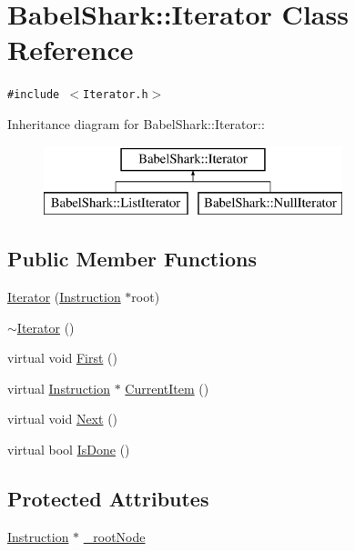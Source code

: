 \hypertarget{class_babel_shark_1_1_iterator}{
\section{BabelShark::Iterator Class Reference}
\label{class_babel_shark_1_1_iterator}
}
{\tt \#include $<$Iterator.h$>$}

Inheritance diagram for BabelShark::Iterator::\begin{figure}[H]
\begin{center}
\leavevmode
\includegraphics[height=2cm]{class_babel_shark_1_1_iterator}
\end{center}
\end{figure}
\subsection*{Public Member Functions}
\begin{CompactItemize}
\item 
\hyperlink{class_babel_shark_1_1_iterator_b30acda521d46ac44cb848cf1726382b}{Iterator} (\hyperlink{class_babel_shark_1_1_instruction}{Instruction} $\ast$root)
\item 
\hyperlink{class_babel_shark_1_1_iterator_a3b5d3ba327b40b256450dc56c12e09e}{$\sim$Iterator} ()
\item 
virtual void \hyperlink{class_babel_shark_1_1_iterator_84ac6a7e539a944a6f67590c8e882001}{First} ()
\item 
virtual \hyperlink{class_babel_shark_1_1_instruction}{Instruction} $\ast$ \hyperlink{class_babel_shark_1_1_iterator_47a9ff22fbd2dc6fdc935f22a7560ce1}{CurrentItem} ()
\item 
virtual void \hyperlink{class_babel_shark_1_1_iterator_5fb7aa35b296dfa34aa1203b6500f2e5}{Next} ()
\item 
virtual bool \hyperlink{class_babel_shark_1_1_iterator_85852cf1ca186d86b07336c100d9834d}{IsDone} ()
\end{CompactItemize}
\subsection*{Protected Attributes}
\begin{CompactItemize}
\item 
\hyperlink{class_babel_shark_1_1_instruction}{Instruction} $\ast$ \hyperlink{class_babel_shark_1_1_iterator_383dec0e585b2a6dfe787c8cd5ba384a}{\_\-rootNode}
\end{CompactItemize}


